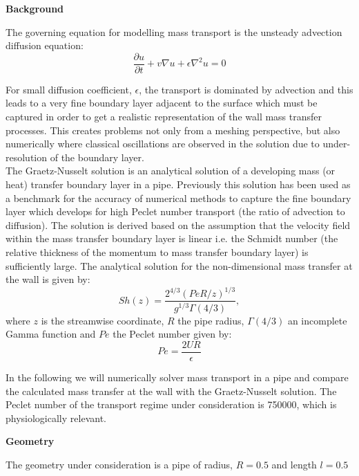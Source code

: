 \textbf{Background}

The governing equation for modelling mass transport is the unsteady advection diffusion equation:
\begin{equation}
\dfrac{\partial u}{\partial t}  + v\nabla u +  \epsilon \nabla^2 u = 0
\end{equation}

For small diffusion coefficient, $\epsilon$, the transport is dominated by advection and this leads to a very fine boundary
 layer adjacent to the surface which must be captured in order to get a realistic representation of the wall mass transfer processes.
 This creates problems not only from a meshing perspective, but also numerically where classical oscillations 
 are observed in the solution due to under-resolution of the boundary layer.\\

The Graetz-Nusselt solution is an analytical solution of a developing mass (or heat) transfer boundary layer in a pipe. 
Previously this solution has been used as a benchmark for the accuracy of numerical methods to capture the fine 
boundary layer which develops for high Peclet number transport (the ratio of advection to diffusion). 
The solution is derived based on the assumption that the velocity field within the mass transfer boundary layer 
is linear i.e. the Schmidt number (the relative thickness of the momentum to mass transfer boundary layer) is sufficiently large. 
The analytical solution for the non-dimensional mass transfer at the wall is given by:
\begin{equation}
S h(z) = \dfrac{2^{4/3}(Pe R/z)^{1/3}}{g^{1/3}\Gamma(4/3)} , 
\end{equation}
where $z$ is the streamwise coordinate, $R$ the pipe radius, $\Gamma(4/3)$ an incomplete 
Gamma function and $Pe$ the Peclet number given by:
\begin{equation}
Pe = \dfrac{2 U R}{\epsilon}
\end{equation}

In the following we will numerically solver mass transport in a pipe and compare the calculated mass transfer 
at the wall with the Graetz-Nusselt solution. The Peclet number of the transport regime under consideration is 
750000, which is physiologically relevant.

\textbf{Geometry}

The geometry under consideration is a pipe of radius, $R = 0.5$ and length $l = 0.5$

